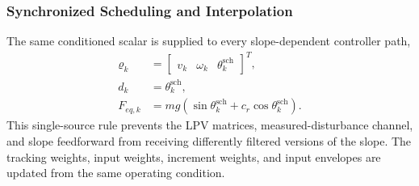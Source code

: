 \documentclass{ieeeaccess}
\begin{document}
\subsubsection{Synchronized Scheduling and Interpolation}

The same conditioned scalar is supplied to every slope-dependent controller path,
\begin{equation}
\begin{aligned}
\boldsymbol\varrho_k
&=\begin{bmatrix}v_k&\omega_k&\theta^{\mathrm{sch}}_k\end{bmatrix}^{T},\\
d_k&=\theta^{\mathrm{sch}}_k,\\
F_{eq,k}&=mg\!\left(
\sin\theta^{\mathrm{sch}}_k+c_r\cos\theta^{\mathrm{sch}}_k
\right).
\end{aligned}
\label{eq:synchronized_slope}
\end{equation}
This single-source rule prevents the LPV matrices, measured-disturbance channel, and slope feedforward from receiving differently filtered versions of the slope. The tracking weights, input weights, increment weights, and input envelopes are updated from the same operating condition.
\end{document}
